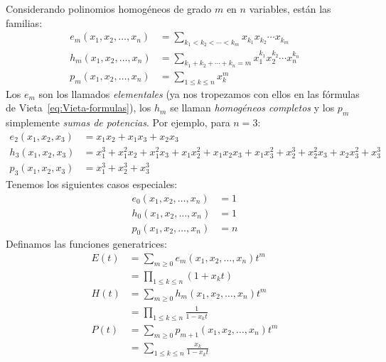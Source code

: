   Considerando polinomios homogéneos
  de grado \(m\) en \(n\) variables,
  están las familias:
  \begin{align}
    e_m(x_1, x_2, \dotsc, x_n)
      &= \sum_{k_1 < k_2 < \dotsb < k_m}
	   x_{k_1} x_{k_2} \dotsm x_{k_m}
	 \label{eq:symmetric-polynomial-e} \\
    h_m(x_1, x_2, \dotsc, x_n)
      &= \sum_{k_1 + k_2 + \dotsb + k_n = m}
	   x_1^{k_1} x_2^{k_2} \dotsm x_n^{k_n}
	 \label{eq:symmetric-polynomial-h} \\
    p_m(x_1, x_2, \dotsc, x_n)
      &= \sum_{1 \le k \le n} x_k^m
	 \label{eq:symmetric-polynomial-p}
  \end{align}
  Los \(e_m\) son los llamados \emph{elementales}%
  (ya nos tropezamos con ellos
   en las fórmulas de Vieta~\eqref{eq:Vieta-formulas}),
  los \(h_m\) se llaman \emph{homogéneos completos}%
  y los \(p_m\) simplemente \emph{sumas de potencias}.%
  Por ejemplo,
  para \(n = 3\):
  \begin{align*}
    e_2(x_1, x_2, x_3)
      &= x_1 x_2 + x_1 x_3 + x_2 x_3 \\
    h_3(x_1, x_2, x_3)
      &= x_1^3 + x_1^2 x_2 + x_1^2 x_3
	     + x_1 x_2^2 + x_1 x_2 x_3 + x_1 x_3^2
	  + x_2^3 + x_2^2 x_3 + x_2 x_3^2
	  + x_3^3 \\
    p_3(x_1, x_2, x_3)
      &= x_1^3 + x_2^3 + x_3^3
  \end{align*}
  Tenemos los siguientes casos especiales:
  \begin{align}
    e_0(x_1, x_2, \dotsc, x_n)
      &= 1 \label{eq:e0=1} \\
    h_0(x_1, x_2, \dotsc, x_n)
      &= 1 \label{eq:h0=1} \\
    p_0(x_1, x_2, \dotsc, x_n)
      &= n \label{eq:p0=n}
  \end{align}
  Definamos las funciones generatrices:%
  \begin{align}
    E(t)
      &= \sum_{m \ge 0} e_m (x_1, x_2, \dotsc, x_n) t^m \\
      &= \prod_{1 \le k \le n} (1 + x_k t)
	 \label{eq:symmetric-polynomial-e-GF} \\
    H(t)
      &= \sum_{m \ge 0} h_m(x_1, x_2, \dotsc, x_n) t^m \\
      &= \prod_{1 \le k \le n} \frac{1}{1 - x_k t}
	 \label{eq:symmetric-polynomial-h-GF} \\
    P(t)
      &= \sum_{m \ge 0} p_{m + 1} (x_1, x_2, \dotsc, x_n) t^m \\
      &= \sum_{1 \le k \le n} \frac{x_k}{1 - x_k t}
	 \label{eq:symmetric-polynomial-p-GF}
  \end{align}
